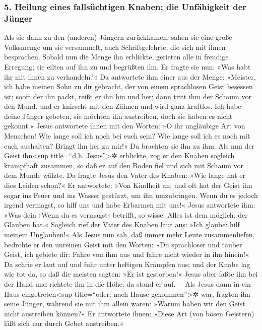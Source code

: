 \hypertarget{heilung-eines-fallsuxfcchtigen-knaben-die-unfuxe4higkeit-der-juxfcnger}{%
\subsubsection{5. Heilung eines fallsüchtigen Knaben; die Unfähigkeit
der
Jünger}\label{heilung-eines-fallsuxfcchtigen-knaben-die-unfuxe4higkeit-der-juxfcnger}}

 Als sie dann zu den (anderen) Jüngern zurückkamen, sahen
sie eine große Volksmenge um sie versammelt, auch Schriftgelehrte, die
sich mit ihnen besprachen.  Sobald nun die Menge ihn
erblickte, gerieten alle in freudige Erregung; sie eilten auf ihn zu und
begrüßten ihn.  Er fragte sie nun: »Was habt ihr mit
ihnen zu verhandeln?«  Da antwortete ihm einer aus der
Menge: »Meister, ich habe meinen Sohn zu dir gebracht, der von einem
sprachlosen Geist besessen ist;  sooft der ihn packt,
reißt er ihn hin und her; dann tritt ihm der Schaum vor den Mund, und er
knirscht mit den Zähnen und wird ganz kraftlos. Ich habe deine Jünger
gebeten, sie möchten ihn austreiben, doch sie haben es nicht gekonnt.«
 Jesus antwortete ihnen mit den Worten: »O ihr ungläubige
Art von Menschen! Wie lange soll ich noch bei euch sein? Wie lange soll
ich es noch mit euch aushalten? Bringt ihn her zu mir!« 
Da brachten sie ihn zu ihm. Als nun der Geist ihn\textless sup
title=``d.h. Jesus''\textgreater✲ erblickte, zog er den Knaben sogleich
krampfhaft zusammen, so daß er auf den Boden fiel und sich mit Schaum
vor dem Munde wälzte.  Da fragte Jesus den Vater des
Knaben: »Wie lange hat er dies Leiden schon?« Er antwortete: »Von
Kindheit an;  und oft hat der Geist ihn sogar ins Feuer
und ins Wasser gestürzt, um ihn umzubringen. Wenn du es jedoch irgend
vermagst, so hilf uns und habe Erbarmen mit uns!«  Jesus
antwortete ihm: »Was dein ›Wenn du es vermagst‹ betrifft, so wisse:
Alles ist dem möglich, der Glauben hat.«  Sogleich rief
der Vater des Knaben laut aus: »Ich glaube: hilf meinem Unglauben!«
 Als Jesus nun sah, daß immer mehr Leute zusammenliefen,
bedrohte er den unreinen Geist mit den Worten: »Du sprachloser und
tauber Geist, ich gebiete dir: Fahre von ihm aus und fahre nicht wieder
in ihn hinein!«  Da schrie er laut auf und fuhr unter
heftigen Krämpfen aus; und der Knabe lag wie tot da, so daß die meisten
sagten: »Er ist gestorben!«  Jesus aber faßte ihn bei der
Hand und richtete ihn in die Höhe: da stand er auf.~-- 
Als Jesus dann in ein Haus eingetreten\textless sup title=``oder: nach
Hause gekommen''\textgreater✲ war, fragten ihn seine Jünger, während sie
mit ihm allein waren: »Warum haben wir den Geist nicht austreiben
können?«  Er antwortete ihnen: »Diese Art (von bösen
Geistern) läßt sich nur durch Gebet austreiben.«

